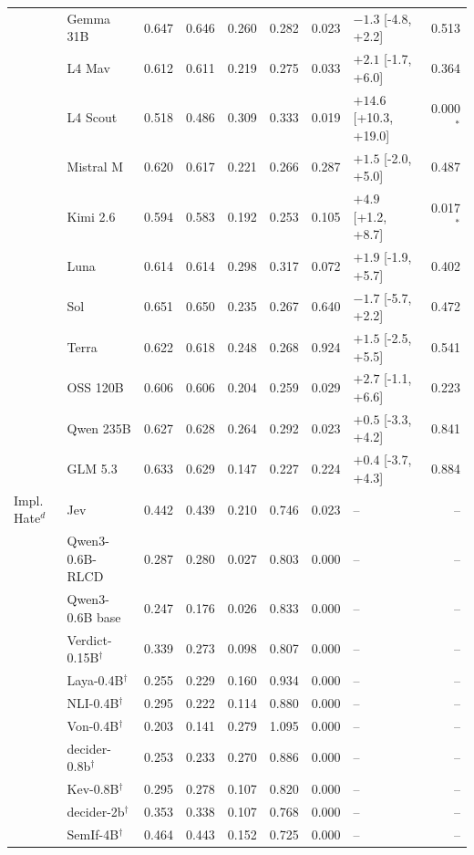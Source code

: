 \begin{longtable}{llrrrrrlr}
 & Gemma 31B & 0.647 & 0.646 & 0.260 & 0.282 & 0.023 & $-1.3$ [-4.8, +2.2] & 0.513 \\
 & L4 Mav & 0.612 & 0.611 & 0.219 & 0.275 & 0.033 & $+2.1$ [-1.7, +6.0] & 0.364 \\
 & L4 Scout & 0.518 & 0.486 & 0.309 & 0.333 & 0.019 & $+14.6$ [+10.3, +19.0] & 0.000$^{*}$ \\
 & Mistral M & 0.620 & 0.617 & 0.221 & 0.266 & 0.287 & $+1.5$ [-2.0, +5.0] & 0.487 \\
 & Kimi 2.6 & 0.594 & 0.583 & 0.192 & 0.253 & 0.105 & $+4.9$ [+1.2, +8.7] & 0.017$^{*}$ \\
 & Luna & 0.614 & 0.614 & 0.298 & 0.317 & 0.072 & $+1.9$ [-1.9, +5.7] & 0.402 \\
 & Sol & 0.651 & 0.650 & 0.235 & 0.267 & 0.640 & $-1.7$ [-5.7, +2.2] & 0.472 \\
 & Terra & 0.622 & 0.618 & 0.248 & 0.268 & 0.924 & $+1.5$ [-2.5, +5.5] & 0.541 \\
 & OSS 120B & 0.606 & 0.606 & 0.204 & 0.259 & 0.029 & $+2.7$ [-1.1, +6.6] & 0.223 \\
 & Qwen 235B & 0.627 & 0.628 & 0.264 & 0.292 & 0.023 & $+0.5$ [-3.3, +4.2] & 0.841 \\
 & GLM 5.3 & 0.633 & 0.629 & 0.147 & 0.227 & 0.224 & $+0.4$ [-3.7, +4.3] & 0.884 \\
\midrule
Impl. Hate$^{d}$ & Jev & 0.442 & 0.439 & 0.210 & 0.746 & 0.023 & -- & -- \\
 & Qwen3-0.6B-RLCD & 0.287 & 0.280 & 0.027 & 0.803 & 0.000 & -- & -- \\
 & Qwen3-0.6B base & 0.247 & 0.176 & 0.026 & 0.833 & 0.000 & -- & -- \\
 & Verdict-0.15B$^{\dagger}$ & 0.339 & 0.273 & 0.098 & 0.807 & 0.000 & -- & -- \\
 & Laya-0.4B$^{\dagger}$ & 0.255 & 0.229 & 0.160 & 0.934 & 0.000 & -- & -- \\
 & NLI-0.4B$^{\dagger}$ & 0.295 & 0.222 & 0.114 & 0.880 & 0.000 & -- & -- \\
 & Von-0.4B$^{\dagger}$ & 0.203 & 0.141 & 0.279 & 1.095 & 0.000 & -- & -- \\
 & decider-0.8b$^{\dagger}$ & 0.253 & 0.233 & 0.270 & 0.886 & 0.000 & -- & -- \\
 & Kev-0.8B$^{\dagger}$ & 0.295 & 0.278 & 0.107 & 0.820 & 0.000 & -- & -- \\
 & decider-2b$^{\dagger}$ & 0.353 & 0.338 & 0.107 & 0.768 & 0.000 & -- & -- \\
 & SemIf-4B$^{\dagger}$ & 0.464 & 0.443 & 0.152 & 0.725 & 0.000 & -- & -- \\

\end{longtable}
